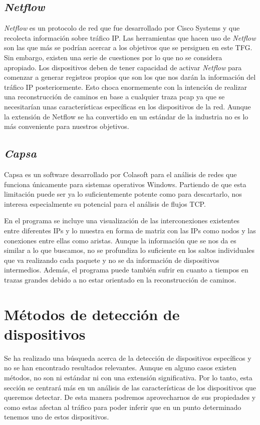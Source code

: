 \documentclass[twoside, 12pt]{epstfg}
\begin{document}
\subsection{\textit{Netflow}}
\textit{Netflow} \cite{NetFlow} es un protocolo de red que fue desarrollado por Cisco Systems y que recolecta información sobre tráfico IP. Las herramientas que hacen uso de \textit{Netflow} son las que más se podrían acercar a los objetivos que se persiguen en este TFG. Sin embargo, existen una serie de cuestiones por lo que no se considera apropiado. Los dispositivos deben de tener capacidad de activar \textit{Netflow} para comenzar a generar registros propios que son los que nos darán la información del tráfico IP posteriormente. Esto choca enormemente con la intención de realizar una reconstrucción de caminos en base a cualquier traza pcap ya que se necesitarían unas características específicas en los dispositivos de la red. Aunque la extensión de Netflow se ha convertido en un estándar de la industria no es lo más conveniente para nuestros objetivos.

\subsection{\textit{Capsa}} 
Capsa \cite{ColasoftCapsa} es un software desarrollado por Colasoft para el análisis de redes que funciona únicamente para sistemas operativos Windows. Partiendo de que esta limitación puede ser ya lo suficientemente potente como para descartarlo, nos interesa especialmente su potencial para el análisis de flujos TCP.

En el programa se incluye una visualización de las interconexiones existentes entre diferentes IPs y lo muestra en forma de matriz con las IPs como nodos y las conexiones entre ellas como aristas. Aunque la información que se nos da es similar a lo que buscamos, no se profundiza lo suficiente en los saltos individuales que va realizando cada paquete y no se da información de dispositivos intermedios. Además, el programa puede también sufrir en cuanto a tiempos en trazas grandes debido a no estar orientado en la reconstrucción de caminos.

\section{Métodos de detección de dispositivos}
Se ha realizado una búsqueda acerca de la detección de dispositivos específicos y no se han encontrado resultados relevantes. Aunque en alguno casos existen métodos, no son ni estándar ni con una extensión significativa. Por lo tanto, esta sección se centrará más en un análisis de las características de los dispositivos que queremos detectar. De esta manera podremos aprovecharnos de sus propiedades y como estas afectan al tráfico para poder inferir que en un punto determinado tenemos uno de estos dispositivos.
\end{document}

